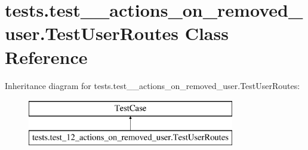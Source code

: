 \hypertarget{classtests_1_1test__12__actions__on__removed__user_1_1_test_user_routes}{}\section{tests.\+test\+\_\+\_\+actions\+\_\+on\+\_\+removed\+\_\+user.\+Test\+User\+Routes Class Reference}
\label{classtests_1_1test__12__actions__on__removed__user_1_1_test_user_routes}
Inheritance diagram for tests.\+test\+\_\+\_\+actions\+\_\+on\+\_\+removed\+\_\+user.\+Test\+User\+Routes\+:\begin{figure}[H]
\begin{center}
\leavevmode
\includegraphics[height=2.000000cm]{classtests_1_1test__12__actions__on__removed__user_1_1_test_user_routes}
\end{center}
\end{figure}

